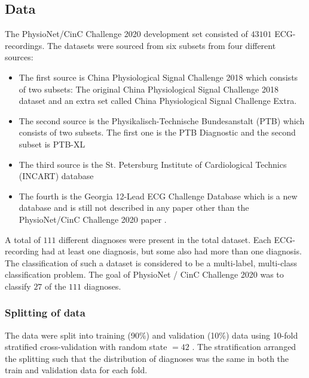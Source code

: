 \subsection{Data}
The PhysioNet/CinC Challenge 2020 development set consisted of $43101$ ECG-recordings. The datasets were sourced from six subsets from four different sources:

\begin{itemize}
    \item The first source is China Physiological Signal Challenge 2018 which consists of two subsets: The original China Physiological Signal Challenge 2018 dataset \cite{liu_open_2018} and an extra set called China Physiological Signal Challenge Extra. 
    \item The second source is the Physikalisch-Technische Bundesanstalt (PTB) which consists of two subsets. The first one is the PTB Diagnostic \cite{bousseljot_nutzung_2009} and the second subset is PTB-XL \cite{wagner_ptb-xl_2020-1}
    \item The third source is the St. Petersburg Institute of Cardiological Technics (INCART) database \cite{goldberger_physiobank_2000}
    \item  The fourth is the Georgia 12-Lead ECG Challenge Database which is a new database and is still not described in any paper other than the PhysioNet/CinC Challenge 2020 paper \cite{alday_classification_2020}.
\end{itemize}
A total of $111$ different diagnoses were present in the total dataset. Each ECG-recording had at least one diagnosis, but some also had more than one diagnosis. The classification of such a dataset is considered to be a multi-label, multi-class classification problem. The goal of PhysioNet / CinC Challenge 2020 was to classify $27$ of the $111$ diagnoses. 



\subsubsection{Splitting of data}\hfill \break

The data were split into training (90\%) and validation (10\%) data using 10-fold stratified cross-validation with random state $=42$ \cite{pedregosa_scikit-learn_2011}. The stratification arranged the splitting such that the distribution of diagnoses was the same in both the train and validation data for each fold.

